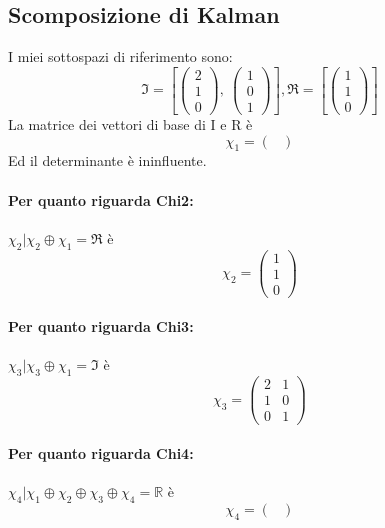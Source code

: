 \documentclass{article}
\begin{document}
\subsection{Scomposizione di Kalman}
I miei sottospazi di riferimento sono:	\[ \mathfrak{I} = \left[ \left(\begin{matrix}2\\1\\0\end{matrix}\right), \  \left(\begin{matrix}1\\0\\1\end{matrix}\right)\right], \mathfrak{R} = \left[ \left(\begin{matrix}1\\1\\0\end{matrix}\right)\right] \]
La matrice dei vettori di base di I e R è \[ \chi_1 =  \left(\begin{matrix}\end{matrix}\right) \]Ed il determinante è ininfluente.
\paragraph{Per quanto riguarda Chi2:} $ \chi_2 | \chi_2 \oplus \chi_1 = \mathfrak{R} $ è \[ \chi_2 = \left(\begin{matrix}1\\1\\0\end{matrix}\right) \]

\paragraph{Per quanto riguarda Chi3:} $ \chi_3 | \chi_3 \oplus \chi_1 = \mathfrak{I} $ è \[ \chi_3 = \left(\begin{matrix}2 & 1\\1 & 0\\0 & 1\end{matrix}\right) \]

\paragraph{Per quanto riguarda Chi4:} $ \chi_4 | \chi_1 \oplus \chi_2 \oplus  \chi_3 \oplus \chi_4 = \mathbb{R} $ è \[ \chi_4 = \left(\begin{matrix}\end{matrix}\right) \]
\end{document}
